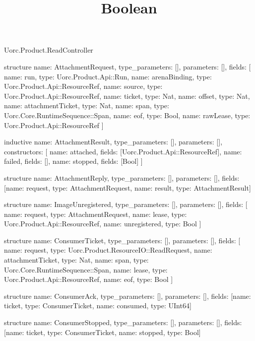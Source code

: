 \begin{lexlean}{Uorc.Product.ReadController}
\title{Boolean}
\begin{semanticmodule}
structure{
  name: AttachmentRequest,
  type_parameters: [],
  parameters: [],
  fields: [
    {name: run, type: Uorc.Product.Api::Run},
    {name: arenaBinding, type: Uorc.Product.Api::ResourceRef},
    {name: source, type: Uorc.Product.Api::ResourceRef},
    {name: ticket, type: Nat},
    {name: offset, type: Nat},
    {name: attachmentTicket, type: Nat},
    {name: span, type: Uorc.Core.RuntimeSequence::Span},
    {name: eof, type: Bool},
    {name: rawLease, type: Uorc.Product.Api::ResourceRef}
  ]
}

inductive{
  name: AttachmentResult,
  type_parameters: [],
  parameters: [],
  constructors: [
    {name: attached, fields: [Uorc.Product.Api::ResourceRef]},
    {name: failed, fields: []},
    {name: stopped, fields: [Bool]}
  ]
}

structure{
  name: AttachmentReply,
  type_parameters: [],
  parameters: [],
  fields: [{name: request, type: AttachmentRequest}, {name: result, type: AttachmentResult}]
}

structure{
  name: ImageUnregistered,
  type_parameters: [],
  parameters: [],
  fields: [
    {name: request, type: AttachmentRequest},
    {name: lease, type: Uorc.Product.Api::ResourceRef},
    {name: unregistered, type: Bool}
  ]
}

structure{
  name: ConsumerTicket,
  type_parameters: [],
  parameters: [],
  fields: [
    {name: request, type: Uorc.Product.ResourceIO::ReadRequest},
    {name: attachmentTicket, type: Nat},
    {name: span, type: Uorc.Core.RuntimeSequence::Span},
    {name: lease, type: Uorc.Product.Api::ResourceRef},
    {name: eof, type: Bool}
  ]
}

structure{
  name: ConsumerAck,
  type_parameters: [],
  parameters: [],
  fields: [{name: ticket, type: ConsumerTicket}, {name: consumed, type: UInt64}]
}

structure{
  name: ConsumerStopped,
  type_parameters: [],
  parameters: [],
  fields: [{name: ticket, type: ConsumerTicket}, {name: stopped, type: Bool}]
}


\end{semanticmodule}
\end{lexlean}
